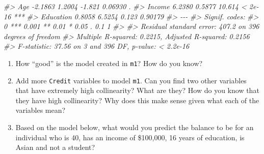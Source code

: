 \documentclass[
]{book}
\newenvironment{Shaded}{\begin{snugshade}}{\end{snugshade}}
\newcommand{\CommentTok}[1]{\textcolor[rgb]{0.56,0.35,0.01}{\textit{#1}}}
\providecommand{\tightlist}{%
  \setlength{\itemsep}{0pt}\setlength{\parskip}{0pt}}
\begin{document}
\begin{Shaded}
\begin{Highlighting}[]
\CommentTok{\#\textgreater{} Age          {-}2.1863     1.2004  {-}1.821  0.06930 .  }
\CommentTok{\#\textgreater{} Income        6.2380     0.5877  10.614  \textless{} 2e{-}16 ***}
\CommentTok{\#\textgreater{} Education     0.8058     6.5254   0.123  0.90179    }
\CommentTok{\#\textgreater{} {-}{-}{-}}
\CommentTok{\#\textgreater{} Signif. codes:  }
\CommentTok{\#\textgreater{} 0 \textquotesingle{}***\textquotesingle{} 0.001 \textquotesingle{}**\textquotesingle{} 0.01 \textquotesingle{}*\textquotesingle{} 0.05 \textquotesingle{}.\textquotesingle{} 0.1 \textquotesingle{} \textquotesingle{} 1}
\CommentTok{\#\textgreater{} }
\CommentTok{\#\textgreater{} Residual standard error: 407.2 on 396 degrees of freedom}
\CommentTok{\#\textgreater{} Multiple R{-}squared:  0.2215, Adjusted R{-}squared:  0.2156 }
\CommentTok{\#\textgreater{} F{-}statistic: 37.56 on 3 and 396 DF,  p{-}value: \textless{} 2.2e{-}16}
\end{Highlighting}
\end{Shaded}

\begin{enumerate}
\def\labelenumi{\arabic{enumi}.}
\setcounter{enumi}{2}
\tightlist
\item
  How ``good'' is the model created in \texttt{m1}? How do you know?
\item
  Add more \texttt{Credit} variables to model \texttt{m1}. Can you find two other variables that have extremely high collinearity? What are they? How do you know that they have high collinearity? Why does this make sense given what each of the variables mean?
\item
  Based on the model below, what would you predict the balance to be for an individual who is 40, has an income of \$100,000, 16 years of education, is Asian and not a student?
\end{enumerate}
\end{document}

